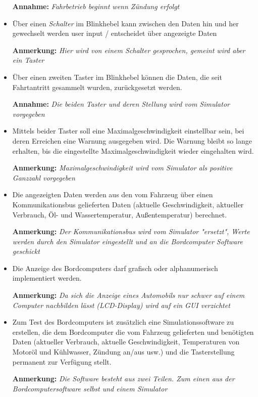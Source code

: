 \documentclass[a4paper,12pt]{article}
\begin{document}
\begin{itemize}
\textbf{Annahme:} \emph{Fahrbetrieb beginnt wenn Zündung erfolgt}

\item Über einen \emph{Schalter} im Blinkhebel kann zwischen den Daten hin und her gewechselt werden 
user input / entscheidet über angezeigte Daten

\textbf{Anmerkung:} \emph{Hier wird von einem Schalter gesprochen, gemeint wird aber ein Taster}

\item Über einen zweiten Taster im Blinkhebel können die Daten, die seit Fahrtantritt gesammelt wurden, zurückgesetzt werden.

\textbf{Annahme:} \emph{Die beiden Taster und deren Stellung wird vom Simulator vorgegeben}

\item Mittels beider Taster soll eine Maximalgeschwindigkeit einstellbar sein, bei deren Erreichen eine Warnung ausgegeben wird. Die Warnung bleibt so lange erhalten, bis die eingestellte Maximalgeschwindigkeit wieder eingehalten wird.

\textbf{Anmerkung:} \emph{Maximalgeschwindigkeit wird vom Simulator als positive Ganzzahl vorgegeben}

\item Die angezeigten Daten werden aus den vom Fahrzeug über einen Kommunikations­bus gelieferten Daten (aktuelle Geschwindigkeit, aktueller Verbrauch, Öl- und Wassertemperatur, Außentemperatur) berechnet. 

\textbf{Anmerkung:} \emph{Der Kommunikationsbus wird vom Simulator "ersetzt", Werte werden durch den Simulator eingestellt und an die Bordcomputer Software geschickt}

\item Die Anzeige des Bordcomputers darf grafisch oder alphanumerisch implementiert werden.

\textbf{Anmerkung:} \emph{Da sich die Anzeige eines Automobils nur schwer auf einem Computer nachbilden lässt (LCD-Display) wird auf ein GUI verzichtet}

\item Zum Test des Bordcomputers ist zusätzlich eine Simulationssoftware zu erstellen, die dem Bordcomputer die vom Fahrzeug gelieferten und benötigten Daten (aktueller Verbrauch, aktuelle Geschwindigkeit, Temperaturen von Motoröl und Kühlwasser, Zündung an/aus usw.) und die Tasterstellung permanent zur Verfügung stellt.

\textbf{Anmerkung:} \emph{Die Software besteht aus zwei Teilen. Zum einen aus der Bordcomputersoftware selbst und einem Simulator}

\end{itemize}
\end{document}

